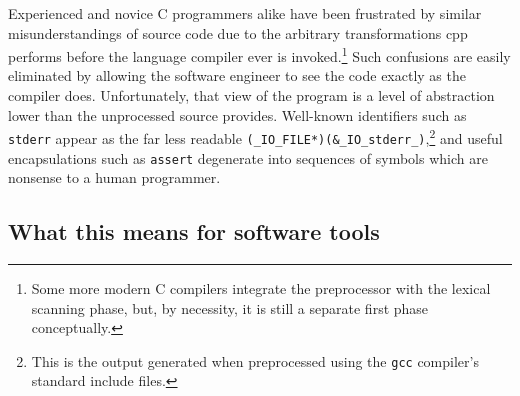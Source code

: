 \documentclass{article}
\newcommand{\Cpp}{\mbox{\textsf{cpp}}}
\newcommand{\C}{\mbox{\textsf{C}}}
\begin{document}
Experienced and novice \C{} programmers alike have been frustrated by
similar misunderstandings of source code due to the arbitrary
transformations \Cpp{} performs before the language compiler ever is
invoked.\footnote{Some more modern \C{} compilers integrate the
  preprocessor with the lexical scanning phase, but, by necessity, it is
  still a separate first phase conceptually.}  Such confusions are
easily eliminated by allowing the software engineer to see the code
exactly as the compiler does.  Unfortunately, that view of the program
is a level of abstraction lower than the unprocessed source provides.
Well-known identifiers such as \texttt{stderr} appear as the far less
readable \texttt{(\_IO\_FILE*)(\&\_IO\_stderr\_)},\footnote{This is the
  output generated when preprocessed using the \texttt{gcc} compiler's
  standard include files.} and useful encapsulations such as
\texttt{assert} degenerate into sequences of symbols which are nonsense
to a human programmer.


\subsection{What this means for software tools}
\end{document}
